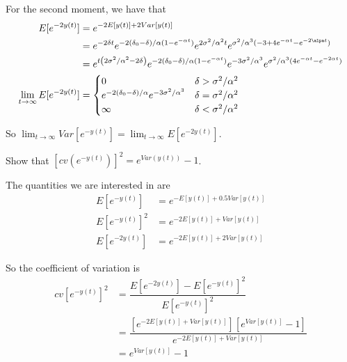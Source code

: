 \documentclass{article}
\numberwithin{questioncounter}{section}
\begin{document}
\begin{solution}
For the second moment, we have that
%
\begin{align*}
E[e^{-2y(t)}] &= e^{-2E[y(t)] + 2Var[y(t)]} \\
&= e^{-2\delta t} e^{-2(\delta_{0} - \delta)/\alpha (1 - e^{-\alpha t})} e^{2\sigma^{2} / \alpha^{2} t} e^{\sigma^{2} / \alpha^{3} (-3 + 4e^{-\alpha t} - e^{-2\alpa t})} \\
&= e^{t\left(2\sigma^{2}/\alpha^{2} - 2\delta\right)} e^{-2(\delta_{0} - \delta)/\alpha (1 - e^{-\alpha t})} e^{-3\sigma^{2} / \alpha^{3}} e^{\sigma^{2}/\alpha^{3} (4e^{-\alpha t} - e^{-2\alpha t})} \\
\lim_{t \to \infty} E[e^{-2y(t)}] &= \begin{cases}
0 & \delta > \sigma^{2} / \alpha^{2} \\
e^{-2(\delta_{0} - \delta)/\alpha} e^{-3\sigma^{2} / \alpha^{3}} & \delta = \sigma^{2} / \alpha^{2} \\
\infty & \delta < \sigma^{2}/\alpha^{2}
\end{cases}
\end{align*}

So $\lim_{t \to \infty} Var[e^{-y(t)}] = \lim_{t \to \infty} E[e^{-2y(t)}]$.

\end{solution}

\begin{question}
Show that $[cv(e^{-y(t)})]^{2} = e^{Var(y(t))} - 1$.
\end{question}

\begin{solution}
The quantities we are interested in are
%
\begin{align*}
E[e^{-y(t)}] &= e^{-E[y(t)] + 0.5Var[y(t)]} \\
E[e^{-y(t)}]^{2} &= e^{-2E[y(t)] + Var[y(t)]} \\
E[e^{-2y(t)}] &= e^{-2E[y(t)] + 2Var[y(t)]}
\end{align*}

So the coefficient of variation is
%
\begin{align*}
cv[e^{-y(t)}]^{2} &= \dfrac{E[e^{-2y(t)}] - E[e^{-y(t)}]^{2}}{E[e^{-y(t)}]^{2}} \\
&= \dfrac{[e^{-2E[y(t)] + Var[y(t)]}][e^{Var[y(t)]} - 1]}{e^{-2E[y(t)] + Var[y(t)]}} \\
&= e^{Var[y(t)]} - 1
\end{align*}

\end{solution}
\end{document}

